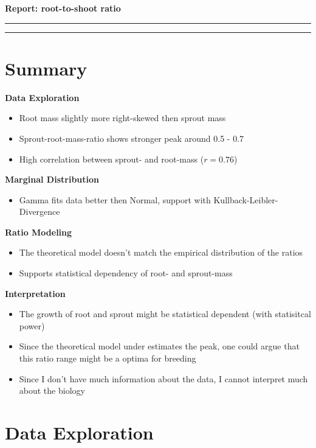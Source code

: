 \documentclass{article}
\begin{document}
	\begin{center}
		\LARGE
		\textbf{Report: root-to-shoot ratio} \vspace{0.5cm}
		\hrule
	\end{center}
	\tableofcontents
	\bigskip  
	\bigskip  
	\hrule
	
	\section{Summary}
	
		\textbf{Data Exploration}
		\begin{itemize}
			\item Root mass slightly more right-skewed then sprout mass
			\item Sprout-root-mass-ratio shows stronger peak around 0.5 - 0.7
			\item High correlation between sprout- and root-mass  ($r = 0.76$)
		\end{itemize}
		
		\textbf{Marginal Distribution}
		\begin{itemize}
			\item Gamma fits data better then Normal, support with Kullback-Leibler-Divergence
		\end{itemize}
		
		\textbf{Ratio Modeling}
		\begin{itemize}
			\item The theoretical model doesn't match the empirical distribution of the ratios
			\item Supports statistical dependency of root- and sprout-mass
		\end{itemize}
		
		\textbf{Interpretation}
		\begin{itemize}
			\item The growth of root and sprout might be statistical dependent (with statisitcal power)
			\item Since the theoretical model under estimates the peak, one could argue that this ratio range might be a optima for breeding
			\item Since I don't have much information about the data, I cannot interpret much about the biology
		\end{itemize}
		
	\newpage
	
	\section{Data Exploration}
\end{document}
